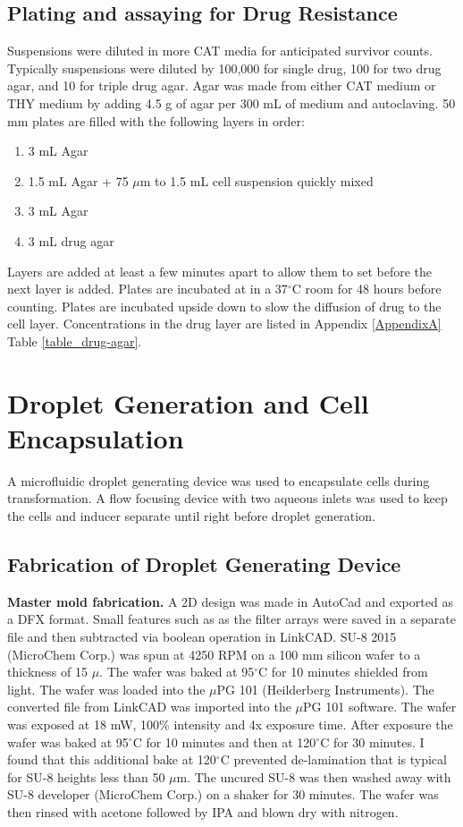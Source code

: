 \subsection{Plating and assaying for Drug Resistance}

Suspensions were diluted in more CAT media for anticipated survivor counts.
Typically suspensions were diluted by 100,000 for single drug, 100 for two drug agar, and 10 for triple drug agar.
Agar was made from either CAT medium or THY medium by adding 4.5 g of agar per 300 mL of medium and autoclaving.
50 mm plates are filled with the following layers in order: 

\begin{enumerate}
\item 3 mL Agar
\item 1.5 mL Agar + 75 $\mu$m to 1.5 mL cell suspension quickly mixed
\item 3 mL Agar
\item 3 mL drug agar
\end{enumerate}

Layers are added at least a few minutes apart to allow them to set before the next layer is added.
Plates are incubated at in a 37$^{\circ}$C room for 48 hours before counting.
Plates are incubated upside down to slow the diffusion of drug to the cell layer.
Concentrations in the drug layer are listed in Appendix \ref{AppendixA} Table \ref{table_drug-agar}.

\section{Droplet Generation and Cell Encapsulation}

A microfluidic droplet generating device was used to encapsulate cells during transformation.
A flow focusing device with two aqueous inlets was used to keep the cells and inducer separate until right before droplet generation.

\subsection{Fabrication of Droplet Generating Device}

\textbf{Master mold fabrication.} A 2D design was made in AutoCad and exported as a DFX format.
Small features such as as the filter arrays were saved in a separate file and then subtracted via boolean operation in LinkCAD.
SU-8 2015 (MicroChem Corp.) was spun at 4250 RPM on a 100 mm silicon wafer to a thickness of 15 $\mu$.
The wafer was baked at 95$^{\circ}$C for 10 minutes shielded from light.
The wafer was loaded into the $\mu$PG 101 (Heilderberg Instruments).
The converted file from LinkCAD was imported into the $\mu$PG 101 software.
The wafer was exposed at 18 mW, 100\% intensity and 4x exposure time.
After exposure the wafer was baked at 95$^{\circ}$C for 10 minutes and then at 120$^{\circ}$C for 30 minutes.
I found that this additional bake at 120$^{\circ}$C prevented de-lamination that is typical for SU-8 heights less than 50 $\mu$m.
The uncured SU-8 was then washed away with SU-8 developer (MicroChem Corp.) on a shaker for 30 minutes.
The wafer was then rinsed with acetone followed by IPA and blown dry with nitrogen.

